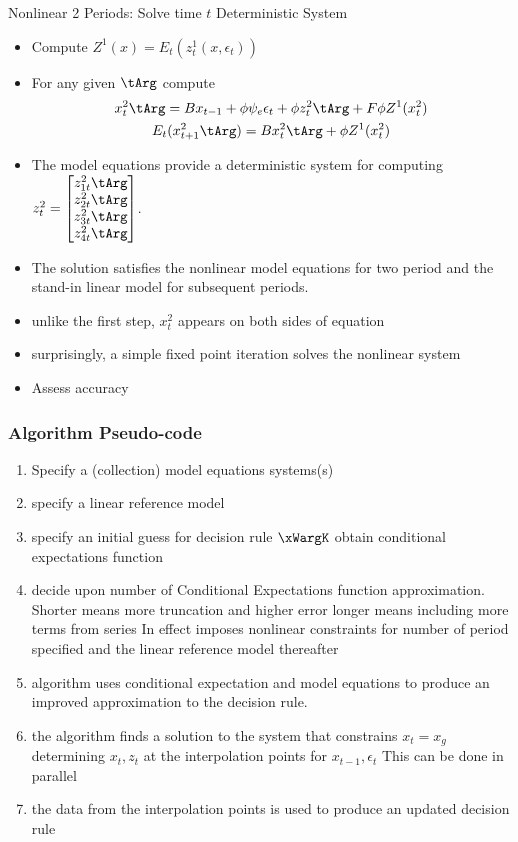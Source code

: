 \documentclass[12pt]{article}
\begin{document}
  {Nonlinear 2 Periods: Solve time $t$ Deterministic
    System }
{\small
  \begin{itemize}
  \item Compute $Z^1(x)= E_t(z^1_t(x,\epsilon_t))$
  \item For any given $\tArg$ 
compute
{\small
  \begin{gather}
    x_t^2\tArg=B x_{t-1} + \phi \psi_e\epsilon_t + \phi z^2_t\tArg + F \phi Z^1(x^2_t) \label{bothS}\\
    E_t(x^2_{t+1}\tArg)=B x^2_{t}\tArg+ \phi Z^1(x^2_t)
  \end{gather}
}
\item The model equations provide a deterministic system  for computing $  z^2_t=\begin{bmatrix}
    z^2_{1t}\tArg\\
    z^2_{2t}\tArg\\
    z^2_{3t}\tArg\\
    z^2_{4t}\tArg
  \end{bmatrix}$.
\item The solution satisfies the nonlinear model equations for two 
period and the stand-in linear model for subsequent periods.
\item unlike the first step, $x^2_t$ appears on both sides of equation 
\item  surprisingly, a simple fixed point iteration solves the nonlinear system
\item Assess accuracy
  \end{itemize}
}

\subsubsection{Algorithm Pseudo-code}
\label{sec:pseudocode}

\begin{enumerate}
\item Specify a (collection) model equations systems(s)
\item specify a linear reference model
\item specify an initial guess for decision rule $\xWargK$ obtain conditional expectations function
\item decide upon number of Conditional Expectations function approximation.  Shorter means more truncation and higher error longer means including more terms from series In effect imposes nonlinear constraints for number of period specified and the linear reference model thereafter
\item algorithm uses conditional expectation and model equations to produce an improved approximation to the decision rule.
\item the algorithm finds a solution to the system that constrains $x_t= x_g$ determining $x_t,z_t$ at the interpolation points for $x_{t-1},\epsilon_t$  This can be done in parallel
\item the data from the interpolation points is used to produce an updated decision rule
\end{enumerate}
\end{document}
